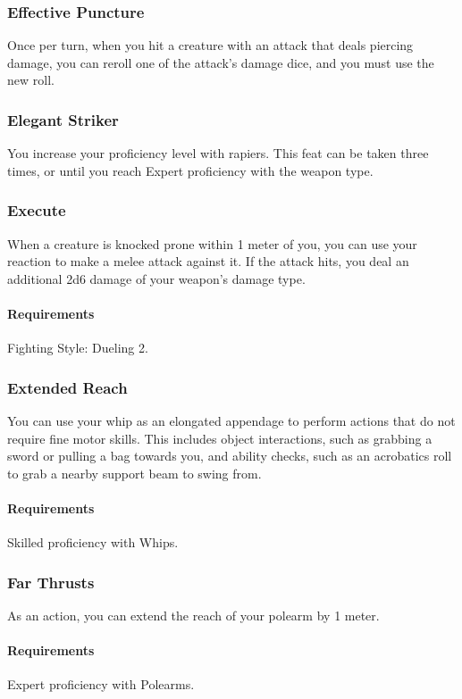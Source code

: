 \subsubsection{Effective Puncture} \label{feat::effectivepuncture}
    Once per turn, when you hit a creature with an attack that deals piercing damage, you can reroll one of the attack's damage dice, and you must use the new roll.
\subsubsection{Elegant Striker} \label{feat::elegantstriker}
    You increase your proficiency level with rapiers.
    This feat can be taken three times, or until you reach Expert proficiency with the weapon type.
\subsubsection{Execute} \label{feat::execute}
    When a creature is knocked prone within 1 meter of you, you can use your reaction to make a melee attack against it.
    If the attack hits, you deal an additional 2d6 damage of your weapon's damage type.
    \paragraph{Requirements} Fighting Style: Dueling 2.
\subsubsection{Extended Reach} \label{feat::extendedreach}
    You can use your whip as an elongated appendage to perform actions that do not require fine motor skills.
    This includes object interactions, such as grabbing a sword or pulling a bag towards you, and ability checks, such as an acrobatics roll to grab a nearby support beam to swing from.
    \paragraph{Requirements} Skilled proficiency with Whips.
\subsubsection{Far Thrusts} \label{feat::farthrusts}
    As an action, you can extend the reach of your polearm by 1 meter.
    \paragraph{Requirements} Expert proficiency with Polearms.
